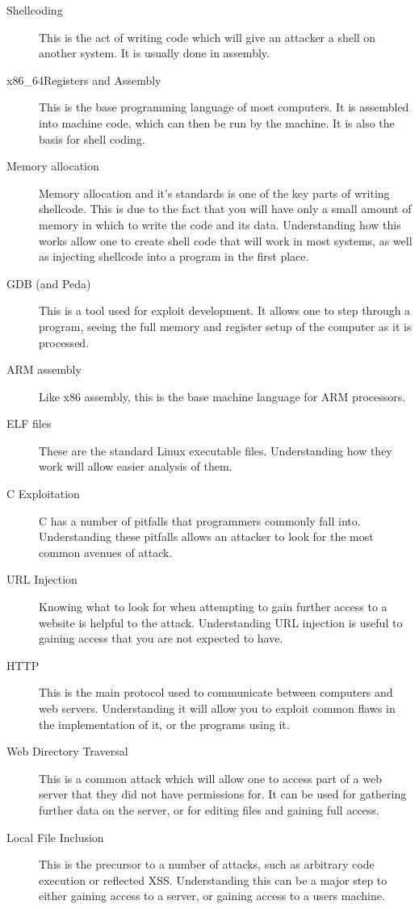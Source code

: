 \documentclass[a4paper,11pt]{report}
\begin{document}
			\begin{description}
				\item[Shellcoding]
					This is the act of writing code which will give an attacker a shell on another system. 
					It is usually done in assembly. 
				\item[x86\_64Registers and Assembly] 
					This is the base programming language of most computers. 
					It is assembled into machine code, which can then be run by the machine. 
					It is also the basis for shell coding. 
				\item[Memory allocation] 
					Memory allocation and it's standards is one of the key parts of writing shellcode. 
					This is due to the fact that you will have only a small amount of memory in which to write the code and its data. 
					Understanding how this works allow one to create shell code that will work in most systems, as well as injecting shellcode into a program in the first place. 
				\item[GDB (and Peda)]
					This is a tool used for exploit development. 
					It allows one to step through a program, seeing the full memory and register setup of the computer as it is processed. 
				\item[ARM assembly]
					Like x86 assembly, this is the base machine language for ARM processors. 
				\item[ELF files]
					These are the standard Linux executable files. 
					Understanding how they work will allow easier analysis of them. 
				\item[C Exploitation]
					C has a number of pitfalls that programmers commonly fall into. 
					Understanding these pitfalls allows an attacker to look for the most common avenues of attack. 
				\item[URL Injection]
					Knowing what to look for when attempting to gain further access to a website is helpful to the attack. 
					Understanding URL injection is useful to gaining access that you are not expected to have. 
				\item[HTTP] 
					This is the main protocol used to communicate between computers and web servers. 
					Understanding it will allow you to exploit common flaws in the implementation of it, or the programs using it. 
				\item[Web Directory Traversal] 
					This is a common attack which will allow one to access part of a web server that they did not have permissions for. 
					It can be used for gathering further data on the server, or for editing files and gaining full access. 
				\item[Local File Inclusion]
					This is the precursor to a number of attacks, such as arbitrary code execution or reflected XSS. 
					Understanding this can be a major step to either gaining access to a server, or gaining access to a users machine. 
			\end{description}
\end{document}

